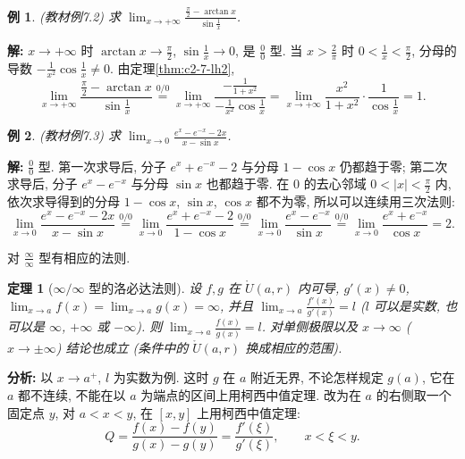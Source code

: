 \documentclass[UTF8,openany]{ctexbook}
\theoremstyle{chinesetextbook}
\newtheorem{example}{例}[section]
\newtheorem{theorem}{定理}[section]
\newenvironment{cnsolution}{\par\indent\textbf{解:} \ignorespaces}{\par}
\begin{document}
\begin{example}\label{ex:c2-7-2}
\textnormal{(教材例7.2)} 求 $\displaystyle\lim_{x\to+\infty}\frac{\frac\pi2-\arctan x}{\sin\frac1x}$.
\end{example}
\begin{cnsolution}
$x\to+\infty$ 时 $\displaystyle\arctan x\to\frac\pi2$, $\displaystyle\sin\frac1x\to0$, 是 $\displaystyle\frac00$ 型. 当 $\displaystyle x>\frac2\pi$ 时 $\displaystyle0<\frac1x<\frac\pi2$, 分母的导数 $\displaystyle-\frac1{x^2}\cos\frac1x\ne0$. 由定理\ref{thm:c2-7-lh2},
\[
\lim_{x\to+\infty}\frac{\frac\pi2-\arctan x}{\sin\frac1x}\overset{0/0}{=}\lim_{x\to+\infty}\frac{-\frac1{1+x^2}}{-\frac1{x^2}\cos\frac1x}=\lim_{x\to+\infty}\frac{x^2}{1+x^2}\cdot\frac1{\cos\frac1x}=1.
\]
\end{cnsolution}
\begin{example}\label{ex:c2-7-3}
\textnormal{(教材例7.3)} 求 $\displaystyle\lim_{x\to0}\frac{e^x-e^{-x}-2x}{x-\sin x}$.
\end{example}
\begin{cnsolution}
$\displaystyle\frac00$ 型. 第一次求导后, 分子 $e^x+e^{-x}-2$ 与分母 $1-\cos x$ 仍都趋于零; 第二次求导后, 分子 $e^x-e^{-x}$ 与分母 $\sin x$ 也都趋于零. 在 $0$ 的去心邻域 $\displaystyle0<|x|<\frac\pi2$ 内, 依次求导得到的分母 $1-\cos x$, $\sin x$, $\cos x$ 都不为零, 所以可以连续用三次法则:
\[
\lim_{x\to0}\frac{e^x-e^{-x}-2x}{x-\sin x}\overset{0/0}{=}\lim_{x\to0}\frac{e^x+e^{-x}-2}{1-\cos x}\overset{0/0}{=}\lim_{x\to0}\frac{e^x-e^{-x}}{\sin x}\overset{0/0}{=}\lim_{x\to0}\frac{e^x+e^{-x}}{\cos x}=2.
\]
\end{cnsolution}
对 $\displaystyle\frac\infty\infty$ 型有相应的法则.
\begin{theorem}[$\infty/\infty$ 型的洛必达法则]\label{thm:c2-7-lh3}
设 $f,g$ 在 $\mathring U(a,r)$ 内可导, $g'(x)\ne0$, $\displaystyle\lim_{x\to a}f(x)=\lim_{x\to a}g(x)=\infty$, 并且 $\displaystyle\lim_{x\to a}\frac{f'(x)}{g'(x)}=l$ ($l$ 可以是实数, 也可以是 $\infty$, $+\infty$ 或 $-\infty$). 则 $\displaystyle\lim_{x\to a}\frac{f(x)}{g(x)}=l$. 对单侧极限以及 $x\to\infty$ ($x\to\pm\infty$) 结论也成立 (条件中的 $\mathring U(a,r)$ 换成相应的范围).
\end{theorem}
\par\indent\textbf{分析:} 以 $x\to a^+$, $l$ 为实数为例. 这时 $g$ 在 $a$ 附近无界, 不论怎样规定 $g(a)$, 它在 $a$ 都不连续, 不能在以 $a$ 为端点的区间上用柯西中值定理. 改为在 $a$ 的右侧取一个固定点 $y$, 对 $a<x<y$, 在 $[x,y]$ 上用柯西中值定理:
\[
Q=\frac{f(x)-f(y)}{g(x)-g(y)}=\frac{f'(\xi)}{g'(\xi)},\qquad x<\xi<y.
\]
\end{document}
